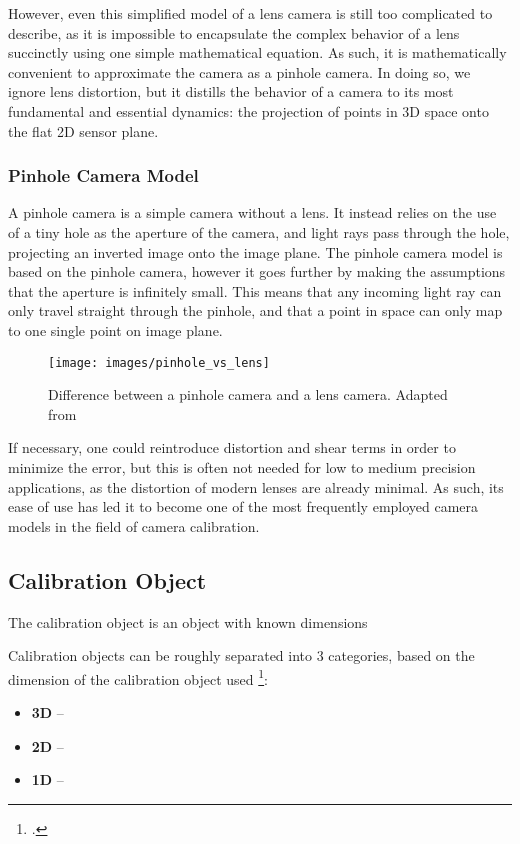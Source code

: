 However, even this simplified model of a lens camera is still too complicated to describe, as it is impossible to encapsulate the complex behavior of a lens succinctly using one simple mathematical equation. As such, it is mathematically convenient to approximate the camera as a pinhole camera. In doing so, we ignore lens distortion, but it distills the behavior of a camera to its most fundamental and essential dynamics: the projection of points in 3D space onto the flat 2D sensor plane. 

\subsubsection{Pinhole Camera Model}

A pinhole camera is a simple camera without a lens. It instead relies on the use of a tiny hole as the aperture of the camera, and light rays pass through the hole, projecting an inverted image onto the image plane. The pinhole camera model is based on the pinhole camera, however it goes further by making the assumptions that the aperture is infinitely small. This means that any incoming light ray can only travel straight through the pinhole, and that a point in space can only map to one single point on image plane. 

\begin{figure}
    \centering
    \texttt{[image: images/pinhole\_vs\_lens]}
    \caption{Difference between a pinhole camera and a lens camera. Adapted from \cite{leCameraModel2018}}
\end{figure}

If necessary, one could reintroduce distortion and shear terms in order to minimize the error, but this is often not needed for low to medium precision applications, as the distortion of modern lenses are already minimal. As such, its ease of use has led it to become one of the most frequently employed camera models in the field of camera calibration. 

\subsection{Calibration Object}

The calibration object is an object with known dimensions 


Calibration objects can be roughly separated into 3 categories, based on the dimension of the calibration object used \footcite{zhangCameraCalibration2007}:

\begin{itemize}[leftmargin=!, itemindent=-4ex]
    \item \textbf{3D} -- 
    \item \textbf{2D} -- 
    \item \textbf{1D} -- 
\end{itemize}
